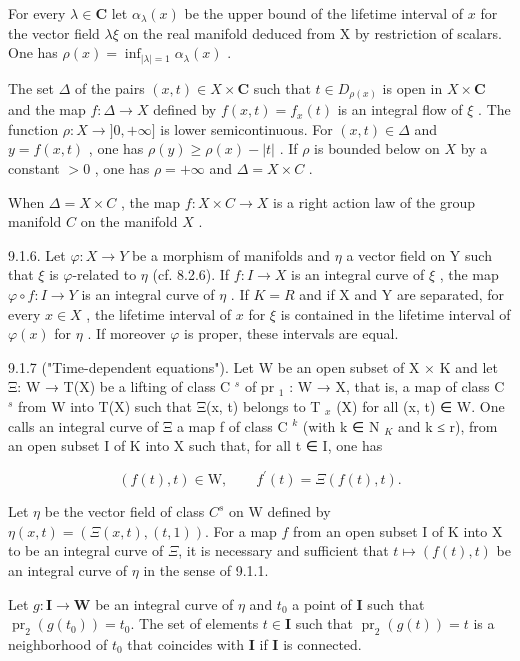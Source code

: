 For every \(\lambda\in\mathbf{C}\) let \(\alpha_{\lambda}(x)\) be the upper bound of the lifetime interval of \(x\) for the vector field \(\lambda\xi\) on the real manifold deduced from X by restriction of scalars. One has \(\rho(x)=\inf_{|\lambda|=1}\alpha_{\lambda}(x)\) .

The set \(\Delta\) of the pairs \((x,t)\in X\times\mathbf{C}\) such that \(t\in D_{\rho(x)}\) is open in \(X\times\mathbf{C}\) and the map \(f:\Delta\to X\) defined by \(f(x,t)=f_x(t)\) is an integral flow of \(\xi\) . The function \(\rho:X\to ]0,+\infty]\) is lower semicontinuous. For \((x,t)\in\Delta\) and \(y=f(x,t)\) , one has \(\rho(y)\geqslant\rho(x)-|t|\) . If \(\rho\) is bounded below on \(X\) by a constant \(>0\) , one has \(\rho = +\infty\) and \(\Delta = X \times C\) .

When \(\Delta = X \times C\) , the map \(f: X \times C \to X\) is a right action law of the group manifold \(C\) on the manifold \(X\) .

9.1.6. Let \(\varphi: X \to Y\) be a morphism of manifolds and \(\eta\) a vector field on Y such that \(\xi\) is \(\varphi\)-related to \(\eta\) (cf. 8.2.6). If \(f: I \to X\) is an integral curve of \(\xi\) , the map \(\varphi \circ f: I \to Y\) is an integral curve of \(\eta\) . If \(K = R\) and if X and Y are separated, for every \(x \in X\) , the lifetime interval of \(x\) for \(\xi\) is contained in the lifetime interval of \(\varphi(x)\) for \(\eta\) . If moreover \(\varphi\) is proper, these intervals are equal.

9.1.7 ("Time-dependent equations"). Let W be an open subset of X × K and let Ξ: W → T(X) be a lifting of class C \(^{s}\) of pr \(_{1}\) : W → X, that is, a map of class C \(^{s}\) from W into T(X) such that Ξ(x, t) belongs to T \(_{x}\) (X) for all (x, t) ∈ W. One calls an integral curve of Ξ a map f of class C \(^{k}\) (with k ∈ N \(_{K}\) and k ≤ r), from an open subset I of K into X such that, for all t ∈ I, one has

\[
(f (t), t) \in \mathrm{W},\qquad f ^ {\prime} (t) = \Xi (f (t), t).
\]

Let \(\eta\) be the vector field of class \(C^s\) on W defined by \(\eta(x, t) = (\Xi(x, t), (t, 1))\). For a map \(f\) from an open subset I of K into X to be an integral curve of \(\Xi\), it is necessary and sufficient that \(t \mapsto (f(t), t)\) be an integral curve of \(\eta\) in the sense of 9.1.1.

Let \(g: \mathbf{I} \to \mathbf{W}\) be an integral curve of \(\eta\) and \(t_0\) a point of \(\mathbf{I}\) such that \(\operatorname{pr}_2(g(t_0)) = t_0\). The set of elements \(t \in \mathbf{I}\) such that \(\operatorname{pr}_2(g(t)) = t\) is a neighborhood of \(t_0\) that coincides with \(\mathbf{I}\) if \(\mathbf{I}\) is connected.

